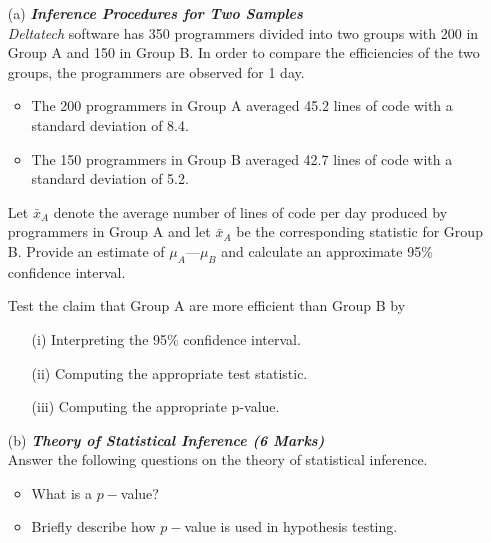 


\begin{itemize}

\item[(a)] \textbf{\textit{Inference Procedures for Two Samples }}\\

\textit{Deltatech} software has 350 programmers divided into two groups with 200 in Group A
and 150 in Group B. In order to compare the efficiencies of the two groups, the
programmers are observed for 1 day.
\begin{itemize}

\item The 200 programmers in Group A averaged 45.2 lines of code with a standard
deviation of 8.4.

\item The 150 programmers in Group B averaged 42.7 lines of code with a standard
deviation of 5.2.
\end{itemize}
Let $\bar{x}_A$ denote the average number of lines of code per day produced by programmers in
Group A and
let $\bar{x}_A$ be the corresponding statistic for Group B.
Provide an estimate of $\mu_A —\mu_B$ and calculate an approximate 95\% confidence interval.

Test the claim that Group A are more efficient than Group B by
\begin{itemize}

\item[(i)]Interpreting the 95\% confidence interval.

\item[(ii)] Computing the appropriate test statistic.
%
\item[(iii)] Computing the appropriate p-value.
\end{itemize}


\item[(b)] \textbf{\textit{Theory of Statistical Inference (6 Marks)}}\\Answer the following questions on the theory of statistical inference.
\begin{itemize}

\item  What is a $p-$value?

\item  Briefly describe how $p-$value is used in hypothesis testing.


\end{itemize}
\end{itemize}
